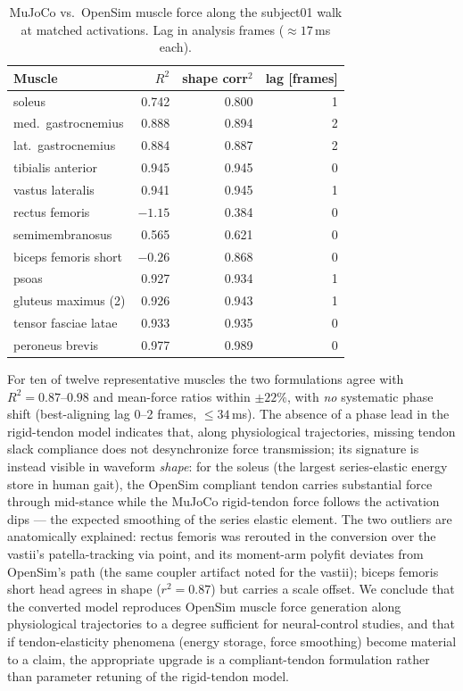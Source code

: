 \begin{table}[h]
  \centering
  \caption{MuJoCo vs.\ OpenSim muscle force along the subject01 walk at
  matched activations. Lag in analysis frames ($\approx 17$\,ms each).}
  \label{tab:force-r2}
  \small
  \begin{tabular}{lrrr}
    \toprule
    Muscle & $R^2$ & shape corr$^2$ & lag [frames] \\
    \midrule
    soleus   & 0.742 & 0.800 & 1 \\
    med.\ gastrocnemius & 0.888 & 0.894 & 2 \\
    lat.\ gastrocnemius & 0.884 & 0.887 & 2 \\
    tibialis anterior & 0.945 & 0.945 & 0 \\
    vastus lateralis & 0.941 & 0.945 & 1 \\
    rectus femoris & $-1.15$ & 0.384 & 0 \\
    semimembranosus & 0.565 & 0.621 & 0 \\
    biceps femoris short & $-0.26$ & 0.868 & 0 \\
    psoas & 0.927 & 0.934 & 1 \\
    gluteus maximus (2) & 0.926 & 0.943 & 1 \\
    tensor fasciae latae & 0.933 & 0.935 & 0 \\
    peroneus brevis & 0.977 & 0.989 & 0 \\
    \bottomrule
  \end{tabular}
\end{table}

For ten of twelve representative muscles the two formulations agree
with $R^2 = 0.87$--$0.98$ and mean-force ratios within $\pm 22\%$, with
\emph{no} systematic phase shift (best-aligning lag 0--2 frames,
$\le 34$\,ms). The absence of a phase lead in the rigid-tendon model
indicates that, along physiological trajectories, missing tendon slack
compliance does not desynchronize force transmission; its signature is
instead visible in waveform \emph{shape}: for the soleus (the largest
series-elastic energy store in human gait), the OpenSim compliant
tendon carries substantial force through mid-stance while the MuJoCo
rigid-tendon force follows the activation dips --- the expected
smoothing of the series elastic element. The two outliers are
anatomically explained: rectus femoris was rerouted in the conversion
over the vastii's patella-tracking via point, and its moment-arm
polyfit deviates from OpenSim's path (the same coupler artifact noted
for the vastii); biceps femoris short head agrees in shape
($r^2 = 0.87$) but carries a scale offset. We conclude that the
converted model reproduces OpenSim muscle force generation along
physiological trajectories to a degree sufficient for neural-control
studies, and that if tendon-elasticity phenomena (energy storage,
force smoothing) become material to a claim, the appropriate upgrade
is a compliant-tendon formulation rather than parameter retuning of
the rigid-tendon model.

